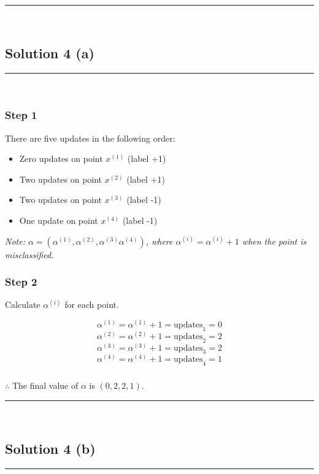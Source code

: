 \documentclass{article}
\begin{document}
\noindent\rule{\textwidth}{0.4pt}\\

\newpage


\subsection*{Solution 4 (a)}
\noindent\rule{\textwidth}{0.4pt}\\

\subsubsection*{Step 1}
\parbox{\textwidth}{
  There are five updates in the following order:
  \begin{itemize}
      \item Zero updates on point $x^{(1)}$ (label +1)
      \item Two updates on point $x^{(2)}$ (label +1)
      \item Two updates on point $x^{(3)}$ (label -1)
      \item One update on point $x^{(4)}$ (label -1)
  \end{itemize}
\textit{Note: $\alpha = (\alpha^{(1)},\alpha^{(2)},\alpha^{(3)}\alpha^{(4)})$, where $\alpha^{(i)} = \alpha^{(i)} + 1$ when the point is misclassified.}
}

\subsubsection*{Step 2}
\parbox{\textwidth}{
Calculate $\alpha^{(i)}$ for each point.
}

$$\alpha^{(1)} = \alpha^{(1)} + 1 = \text{updates}_1 = 0 $$
$$\alpha^{(2)} = \alpha^{(2)} + 1 = \text{updates}_2 = 2$$
$$\alpha^{(3)} = \alpha^{(3)} + 1 = \text{updates}_3 = 2$$
$$\alpha^{(4)} = \alpha^{(4)} + 1 = \text{updates}_4 = 1$$

\subsubsection*{\normalfont}{$\therefore$ The final value of $\alpha$ is $(0, 2, 2, 1)$.}

\newpage

\noindent\rule{\textwidth}{0.4pt}\\

\subsection*{Solution 4 (b)}
\noindent\rule{\textwidth}{0.4pt}\\
\end{document}
